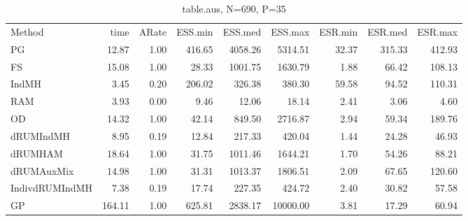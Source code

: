\begin{table}
\label{tab:blogit-aus}
\begin{tabular}{l r r r r r r r r } 
          Method  &     time &    ARate &  ESS.min &  ESS.med &  ESS.max &  ESR.min &  ESR.med &  ESR.max \\ 
              PG  &    12.87 &     1.00 &   416.65 &  4058.26 &  5314.51 &    32.37 &   315.33 &   412.93 \\ 
              FS  &    15.08 &     1.00 &    28.33 &  1001.75 &  1630.79 &     1.88 &    66.42 &   108.13 \\ 
           IndMH  &     3.45 &     0.20 &   206.02 &   326.38 &   380.30 &    59.58 &    94.52 &   110.31 \\ 
             RAM  &     3.93 &     0.00 &     9.46 &    12.06 &    18.14 &     2.41 &     3.06 &     4.60 \\ 
              OD  &    14.32 &     1.00 &    42.14 &   849.50 &  2716.87 &     2.94 &    59.34 &   189.76 \\ 
       dRUMIndMH  &     8.95 &     0.19 &    12.84 &   217.33 &   420.04 &     1.44 &    24.28 &    46.93 \\ 
         dRUMHAM  &    18.64 &     1.00 &    31.75 &  1011.46 &  1644.21 &     1.70 &    54.26 &    88.21 \\ 
      dRUMAuxMix  &    14.98 &     1.00 &    31.31 &  1013.37 &  1806.51 &     2.09 &    67.65 &   120.60 \\ 
  IndivdRUMIndMH  &     7.38 &     0.19 &    17.74 &   227.35 &   424.72 &     2.40 &    30.82 &    57.58 \\ 
              GP  &   164.11 &     1.00 &   625.81 &  2838.17 & 10000.00 &     3.81 &    17.29 &    60.94
 \end{tabular}
\caption{table.aus, N=690, P=35}
\end{table}

